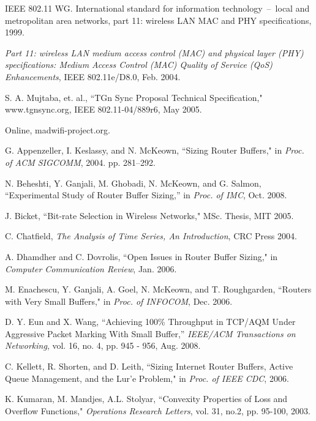 \documentclass[10pt,twocolumn, journal]{IEEEtran}
\begin{document}
\begin{thebibliography}{}

IEEE 802.11 WG. International standard for information technology~--~local and
metropolitan area networks, part 11: wireless LAN MAC and PHY specifications, 1999.

\emph{Part 11: wireless LAN medium access control (MAC) and physical layer (PHY)
specifications: Medium Access Control (MAC) Quality of Service (QoS) Enhancements}, IEEE
802.11e/D8.0, Feb. 2004.

S. A. Mujtaba, et. al., ``TGn Sync Proposal Technical Specification," www.tgnsync.org,
IEEE 802.11-04/889r6, May 2005.

 Online, madwifi-project.org.

G. Appenzeller, I. Keslassy, and N. McKeown, ``Sizing Router Buffers," in \emph{Proc. of ACM SIGCOMM}, 2004. pp.
281--292.

N. Beheshti, Y. Ganjali, M. Ghobadi, N. McKeown, and G. Salmon, ``Experimental Study of Router Buffer Sizing,'' in \emph{Proc. of IMC}, Oct. 2008.


J. Bicket, ``Bit-rate Selection in Wireless Networks," MSc. Thesis, MIT 2005.

C. Chatfield, \emph{The Analysis of Time Series, An Introduction}, CRC Press 2004.

A. Dhamdher and C. Dovrolis, ``Open Issues in Router Buffer Sizing," in \emph{Computer
Communication Review}, Jan. 2006.


M. Enachescu, Y. Ganjali, A. Goel, N. McKeown, and T. Roughgarden, ``Routers with Very
Small Buffers," in \emph{Proc. of INFOCOM}, Dec. 2006.


D. Y. Eun and X. Wang, 	``Achieving 100\% Throughput in TCP/AQM Under Aggressive Packet Marking With Small Buffer,'' \emph{IEEE/ACM Transactions on Networking}, vol. 16, no. 4, pp. 945 - 956, Aug. 2008.


C. Kellett, R. Shorten, and D. Leith, ``Sizing Internet Router Buffers, Active Queue
Management, and the Lur'e Problem," in \emph{Proc. of IEEE CDC}, 2006.

K. Kumaran, M. Mandjes, A.L. Stolyar, ``Convexity Properties of Loss and Overflow Functions," \textit{Operations Research Letters},  vol. 31, no.2, pp. 95-100, 2003.



\end{thebibliography}
\end{document}
